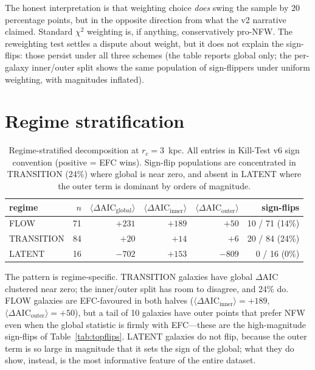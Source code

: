 \documentclass[11pt,a4paper]{article}
\begin{document}
The honest interpretation is that weighting choice {\em does} swing the
sample by 20 percentage points, but in the opposite direction from what
the v2 narrative claimed.  Standard $\chi^2$ weighting is, if anything,
conservatively pro-NFW.  The reweighting test settles a dispute about
weight, but it does not explain the sign-flips: those persist under all
three schemes (the table reports global only; the per-galaxy
inner/outer split shows the same population of sign-flippers under
uniform weighting, with magnitudes inflated).

\section{Regime stratification}
\label{sec:regime}

\begin{table}[h]
\centering
\small
\begin{tabular}{lrrrrr}
\toprule
regime & $n$ & $\langle\Delta\text{AIC}_{\text{global}}\rangle$ & $\langle\Delta\text{AIC}_{\text{inner}}\rangle$ & $\langle\Delta\text{AIC}_{\text{outer}}\rangle$ & sign-flips \\
\midrule
FLOW       & 71 & $+231$ & $+189$ & $+50$  & 10 / 71 (14\%) \\
TRANSITION & 84 & $+20$  & $+14$  & $+6$   & 20 / 84 (24\%) \\
LATENT     & 16 & $-702$ & $+153$ & $-809$ & 0 / 16 (0\%) \\
\bottomrule
\end{tabular}
\caption{Regime-stratified decomposition at $r_c=3$~kpc.  All entries in
Kill-Test v6 sign convention (positive = EFC wins).  Sign-flip
populations are concentrated in TRANSITION (24\%) where global is near
zero, and absent in LATENT where the outer term is dominant by orders
of magnitude.}
\label{tab:regime}
\end{table}

The pattern is regime-specific.  TRANSITION galaxies have global
$\Delta$AIC clustered near zero; the inner/outer split has room to
disagree, and 24\% do.  FLOW galaxies are EFC-favoured in both halves
($\langle\Delta\text{AIC}_{\text{inner}}\rangle=+189$,
$\langle\Delta\text{AIC}_{\text{outer}}\rangle=+50$), but a tail of 10
galaxies have outer points that prefer NFW even when the global
statistic is firmly with EFC---these are the high-magnitude sign-flips
of Table~\ref{tab:topflips}.  LATENT galaxies do not flip, because the
outer term is so large in magnitude that it sets the sign of the
global; what they do show, instead, is the most informative feature
of the entire dataset.
\end{document}
